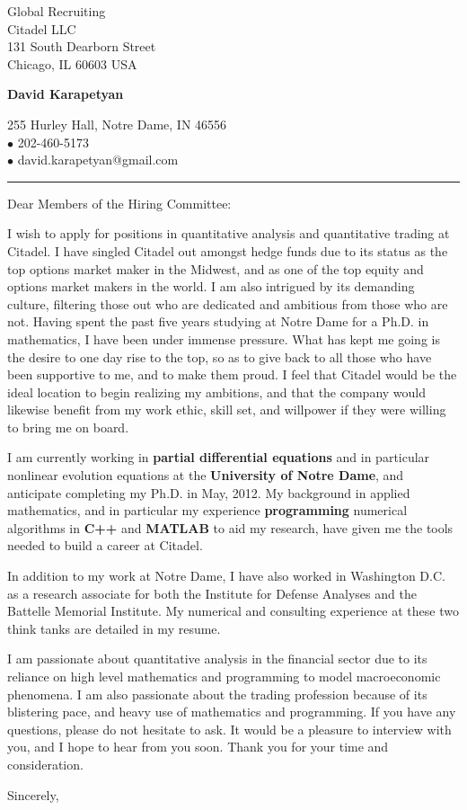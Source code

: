 \documentclass[12pt]{letter}
\date{\vspace{0.5cm}\flushleft}
\begin{document}
\begin{letter}{Global Recruiting \\
Citadel LLC \\
131 South Dearborn Street  \\
Chicago, IL 60603 USA 
}
\begin{center}
{\bf {\Large David Karapetyan}}
\end{center}

\begin{center}
{255 Hurley Hall, Notre Dame, IN 46556  \\ $\bullet$
202-460-5173 \\ $\bullet$ david.karapetyan@gmail.com
}
\end{center}
\hrule

\opening{Dear Members of the Hiring Committee:\\}
%
%
I wish to apply for positions in quantitative analysis and quantitative
trading at Citadel. I have singled Citadel out amongst hedge funds due to its status as the top options market maker in the Midwest, and as one of the top equity and options market makers in the world. I am also intrigued by its demanding culture, filtering those out who are dedicated and ambitious from those who are not. Having spent the past five years studying at Notre Dame for a Ph.D. in mathematics, I have been under immense pressure. What has kept me going is the desire to one day rise to the top, so as to give back to all those who have been supportive to me, and to make them proud. I feel that Citadel would be the ideal location to begin realizing my ambitions, and that the company would likewise benefit from my work ethic, skill set, and willpower if they were willing to bring me on board. 

I am currently working in \textbf{partial differential
equations} and in particular nonlinear evolution equations at the
\textbf{University of Notre Dame}, and anticipate completing my Ph.D. in May, 2012. My
background in applied mathematics, and in particular my experience
\textbf{programming} numerical algorithms in \textbf{C++} and \textbf{MATLAB}
to aid my research, have given me the tools needed to build a career at Citadel.

In addition to my work at Notre Dame, I have also worked in Washington D.C. as a research
associate for both the Institute for Defense Analyses and the Battelle Memorial
Institute. My numerical and consulting experience at these two think tanks are
detailed in my resume. 

I am passionate about quantitative analysis in the financial sector due to its reliance on high level mathematics and programming to model macroeconomic phenomena. I am also passionate about the trading profession because of its blistering pace, and heavy use of mathematics and programming. 
If you have any questions, please do not hesitate to ask. It would be a
pleasure to interview with you, and I hope to hear from you soon. Thank you for
your time and consideration. 

\closing{Sincerely,}


\end{letter}
\end{document}
